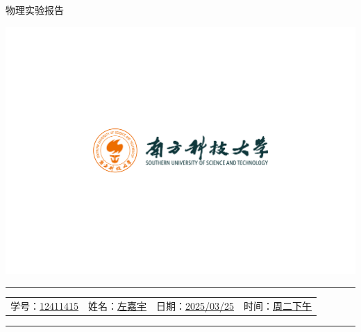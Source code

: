 \documentclass[12pt,a4paper]{article}
\begin{document}
	\noindent
	\hspace{-2em}
	\begin{minipage}[c]{0.65\textwidth}
		\raggedright
		{\fontsize{40pt}{60pt}\selectfont 物理实验报告}
	\end{minipage}
	\begin{minipage}[c]{0.35\textwidth}
		\raggedleft
		\includegraphics[width=\linewidth, trim={20cm 20cm 20cm 20cm}, clip]{university_logo.png}
	\end{minipage}

	\vspace{-1em}
	

	
	\hrule
	\vspace{0.4em}
	\noindent
	\begin{tabular}{l l l l}
    学号：\underline{12411415} & 姓名：\underline{左嘉宇} &
    日期：\underline{2025/03/25} & 时间：\underline{周二下午}
	\end{tabular}
	\vspace{-0em}
	\par
	\hrule

	
\end{document}
